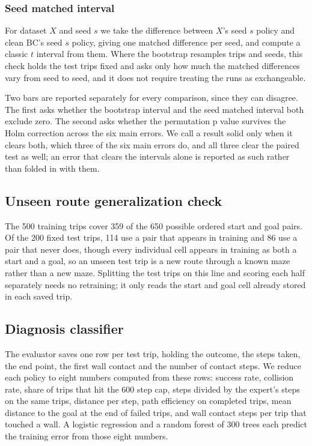 \documentclass[conference]{IEEEtran}
\begin{document}
\subsubsection{Seed matched interval}
For dataset $X$ and seed $s$ we take the difference between $X$'s seed $s$ policy and clean BC's seed $s$ policy,
giving one matched difference per seed, and compute a classic $t$ interval from them. Where the bootstrap
resamples trips and seeds, this check holds the test trips fixed and asks only how much the matched differences
vary from seed to seed, and it does not require treating the runs as exchangeable.

Two bars are reported separately for every comparison, since they can disagree. The first asks whether the
bootstrap interval and the seed matched interval both exclude zero. The second asks whether the permutation p
value survives the Holm correction across the six main errors. We call a result solid only when it clears both,
which three of the six main errors do, and all three clear the paired test as well; an error that clears the
intervals alone is reported as such rather than folded in with them.

\subsection{Unseen route generalization check}\label{sec:gen-method}
The 500 training trips cover 359 of the 650 possible ordered start and goal pairs. Of the 200 fixed test trips,
114 use a pair that appears in training and 86 use a pair that never does, though every individual cell appears
in training as both a start and a goal, so an unseen test trip is a new route through a known maze rather than a
new maze. Splitting the test trips on this line and scoring each half separately needs no retraining; it only
reads the start and goal cell already stored in each saved trip.

\subsection{Diagnosis classifier}
The evaluator saves one row per test trip, holding the outcome, the steps taken, the end point, the first wall
contact and the number of contact steps. We reduce each policy to eight numbers computed from these rows: success
rate, collision rate, share of trips that hit the 600 step cap, steps divided by the expert's steps on the same
trips, distance per step, path efficiency on completed trips, mean distance to the goal at the end of failed
trips, and wall contact steps per trip that touched a wall. A logistic regression and a random forest of 300
trees \cite{breiman} each predict the training error from those eight numbers.
\end{document}
